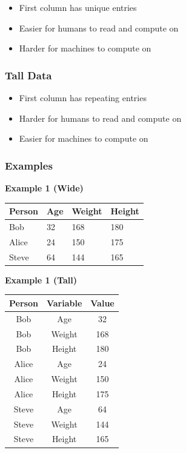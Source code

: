 \documentclass[
  12pt,
]{book}
\begin{document}
\begin{itemize}
\item
  First column has unique entries
\item
  Easier for humans to read and compute on
\item
  Harder for machines to compute on
\end{itemize}

\hypertarget{tall-data}{%
\subsubsection{Tall Data}\label{tall-data}}

\begin{itemize}
\item
  First column has repeating entries
\item
  Harder for humans to read and compute on
\item
  Easier for machines to compute on
\end{itemize}

\hypertarget{examples}{%
\subsubsection{Examples}\label{examples}}

\textbf{Example 1 (Wide)}

\begin{longtable}[]{@{}llll@{}}
\toprule()
\textbf{Person } & \textbf{Age } & \textbf{Weight } & \textbf{Height } \\
\midrule()
\endhead
Bob & 32 & 168 & 180 \\
Alice & 24 & 150 & 175 \\
Steve & 64 & 144 & 165 \\
\bottomrule()
\end{longtable}

\textbf{Example 1 (Tall)}

\begin{longtable}[]{@{}ccc@{}}
\toprule()
\textbf{Person } & \textbf{Variable } & \textbf{Value } \\
\midrule()
\endhead
Bob & Age & 32 \\
Bob & Weight & 168 \\
Bob & Height & 180 \\
Alice & Age & 24 \\
Alice & Weight & 150 \\
Alice & Height & 175 \\
Steve & Age & 64 \\
Steve & Weight & 144 \\
Steve & Height & 165 \\
\bottomrule()
\end{longtable}
\end{document}
